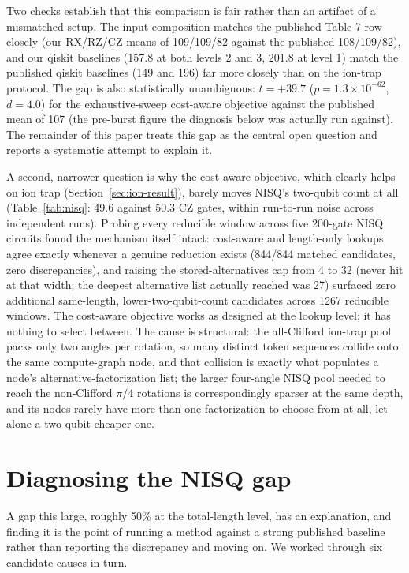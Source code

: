 \documentclass[11pt]{article}
\begin{document}
Two checks establish that this comparison is fair rather than an artifact
of a mismatched setup. The input composition matches the published Table 7
row closely (our RX/RZ/CZ means of 109/109/82 against the published
108/109/82), and our qiskit baselines (157.8 at both levels 2 and 3,
201.8 at level 1) match the published qiskit baselines (149 and 196) far
more closely than on the ion-trap protocol. The gap is also statistically
unambiguous: $t=+39.7$ ($p=1.3\times10^{-62}$, $d=4.0$) for the exhaustive-sweep
cost-aware objective against the published mean of 107 (the pre-burst
figure the diagnosis below was actually run against). The remainder of
this paper treats this gap as the central open question and reports a
systematic attempt to explain it.

A second, narrower question is why the cost-aware objective, which clearly
helps on ion trap (Section~\ref{sec:ion-result}), barely moves NISQ's
two-qubit count at all (Table~\ref{tab:nisq}: 49.6 against 50.3 CZ gates,
within run-to-run noise across independent runs). Probing every reducible
window across five 200-gate NISQ circuits found the mechanism itself
intact: cost-aware and length-only lookups agree exactly whenever a
genuine reduction exists (844/844 matched candidates, zero discrepancies),
and raising the stored-alternatives cap from 4 to 32 (never hit at that
width; the deepest alternative list actually reached was 27) surfaced zero
additional same-length, lower-two-qubit-count candidates across 1267
reducible windows. The cost-aware objective works as designed at the
lookup level; it has nothing to select between. The cause is structural:
the all-Clifford ion-trap pool packs only two angles per rotation, so many
distinct token sequences collide onto the same compute-graph node, and
that collision is exactly what populates a node's alternative-factorization
list; the larger four-angle NISQ pool needed to reach the non-Clifford
$\pi/4$ rotations is correspondingly sparser at the same depth, and its
nodes rarely have more than one factorization to choose from at all, let
alone a two-qubit-cheaper one.

\section{Diagnosing the NISQ gap}
\label{sec:discussion}

A gap this large, roughly 50\% at the total-length level, has an
explanation, and finding it is the point of running a method against a
strong published baseline rather than reporting the discrepancy and moving
on. We worked through six candidate causes in turn.
\end{document}
